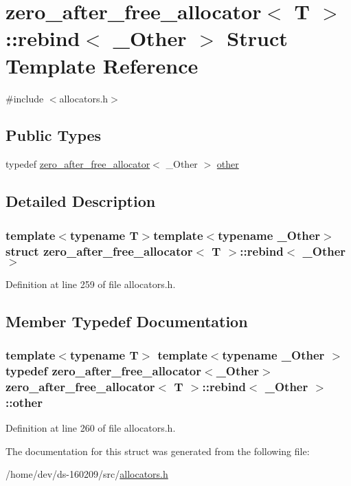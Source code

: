 \hypertarget{structzero__after__free__allocator_1_1rebind}{}\section{zero\+\_\+after\+\_\+free\+\_\+allocator$<$ T $>$\+:\+:rebind$<$ \+\_\+\+Other $>$ Struct Template Reference}
\label{structzero__after__free__allocator_1_1rebind}


{\ttfamily \#include $<$allocators.\+h$>$}

\subsection*{Public Types}
\begin{DoxyCompactItemize}
\item 
typedef \hyperlink{structzero__after__free__allocator}{zero\+\_\+after\+\_\+free\+\_\+allocator}$<$ \+\_\+\+Other $>$ \hyperlink{structzero__after__free__allocator_1_1rebind_aef5ba2251ba370df22fbd0a05e3cf284}{other}
\end{DoxyCompactItemize}


\subsection{Detailed Description}
\subsubsection*{template$<$typename T$>$template$<$typename \+\_\+\+Other$>$struct zero\+\_\+after\+\_\+free\+\_\+allocator$<$ T $>$\+::rebind$<$ \+\_\+\+Other $>$}



Definition at line 259 of file allocators.\+h.



\subsection{Member Typedef Documentation}
\hypertarget{structzero__after__free__allocator_1_1rebind_aef5ba2251ba370df22fbd0a05e3cf284}{}
\subsubsection[{other}]{\setlength{\rightskip}{0pt plus 5cm}template$<$typename T$>$ template$<$typename \+\_\+\+Other $>$ typedef {\bf zero\+\_\+after\+\_\+free\+\_\+allocator}$<$\+\_\+\+Other$>$ {\bf zero\+\_\+after\+\_\+free\+\_\+allocator}$<$ T $>$\+::{\bf rebind}$<$ \+\_\+\+Other $>$\+::{\bf other}}\label{structzero__after__free__allocator_1_1rebind_aef5ba2251ba370df22fbd0a05e3cf284}


Definition at line 260 of file allocators.\+h.



The documentation for this struct was generated from the following file\+:\begin{DoxyCompactItemize}
\item 
/home/dev/ds-\/160209/src/\hyperlink{allocators_8h}{allocators.\+h}\end{DoxyCompactItemize}
